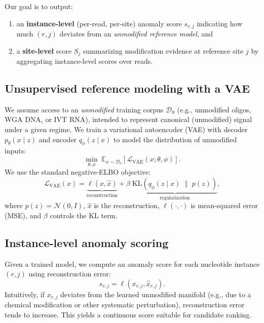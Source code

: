 \documentclass[sigconf, review]{acmart}
\begin{document}
Our goal is to output:
\begin{enumerate}
    \item an \textbf{instance-level} (per-read, per-site) anomaly score $s_{r,j}$ indicating how much
    $(r,j)$ deviates from an \emph{unmodified reference model}, and
    \item a \textbf{site-level} score $S_j$ summarizing modification evidence at reference site $j$
    by aggregating instance-level scores over reads.
\end{enumerate}

\subsection{Unsupervised reference modeling with a VAE}
We assume access to an \emph{unmodified} training corpus $\mathcal{D}_0$ (e.g., unmodified oligos,
WGA DNA, or IVT RNA), intended to represent canonical (unmodified) signal under a given regime.
We train a variational autoencoder (VAE) with decoder $p_\theta(x \mid z)$ and encoder
$q_\phi(z \mid x)$ to model the distribution of unmodified inputs:
\begin{equation}
\min_{\theta,\phi}\; \mathbb{E}_{x \sim \mathcal{D}_0}\left[\mathcal{L}_{\mathrm{VAE}}(x; \theta,\phi)\right].
\end{equation}
We use the standard negative-ELBO objective:
\begin{equation}
\mathcal{L}_{\mathrm{VAE}}(x)
=
\underbrace{\ell\!\left(x,\hat{x}\right)}_{\text{reconstruction}}
+
\beta\;
\underbrace{\mathrm{KL}\!\left(q_\phi(z \mid x)\;\|\;p(z)\right)}_{\text{regularization}},
\end{equation}
where $p(z)=\mathcal{N}(0,I)$, $\hat{x}$ is the reconstruction, $\ell(\cdot,\cdot)$ is mean-squared
error (MSE), and $\beta$ controls the KL term.

\subsection{Instance-level anomaly scoring}
Given a trained model, we compute an anomaly score for each nucleotide instance $(r,j)$ using
reconstruction error:
\begin{equation}
s_{r,j} = \ell\!\left(x_{r,j}, \hat{x}_{r,j}\right).
\end{equation}
Intuitively, if $x_{r,j}$ deviates from the learned unmodified manifold (e.g., due to a chemical
modification or other systematic perturbation), reconstruction error tends to increase. This yields a
continuous score suitable for candidate ranking.
\end{document}
